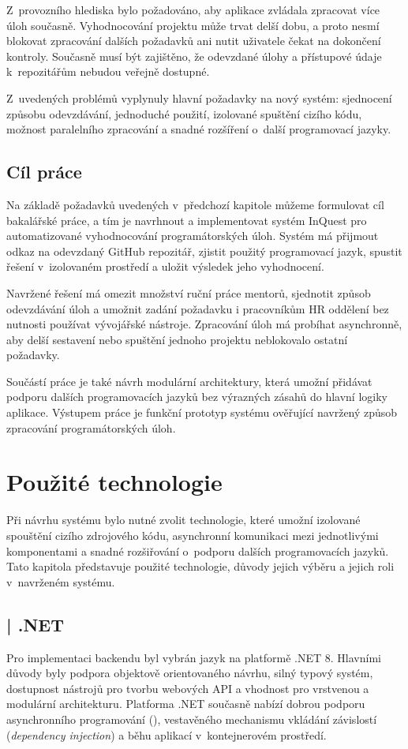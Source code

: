 \documentclass[
  biblatex,
  figures,
  tables,
  glossaries,
  index
]{kidiplom}
\begin{document}
Z~provozního hlediska bylo požadováno, aby aplikace zvládala zpracovat více úloh současně. Vyhodnocování projektu může trvat delší dobu, a proto nesmí blokovat zpracování dalších požadavků ani nutit uživatele čekat na dokončení kontroly. Současně musí být zajištěno, že odevzdané úlohy a přístupové údaje k~repozitářům nebudou veřejně dostupné.

Z~uvedených problémů vyplynuly hlavní požadavky na nový systém: sjednocení způsobu odevzdávání, jednoduché použití, izolované spuštění cizího kódu, možnost paralelního zpracování a snadné rozšíření o~další programovací jazyky.


\subsection{Cíl práce}
Na základě požadavků uvedených v~předchozí kapitole můžeme formulovat cíl bakalářské práce, a tím je navrhnout a implementovat systém InQuest pro automatizované vyhodnocování programátorských úloh. Systém má přijmout odkaz na odevzdaný GitHub repozitář, zjistit použitý programovací jazyk, spustit řešení v~izolovaném prostředí a uložit výsledek jeho vyhodnocení.

Navržené řešení má omezit množství ruční práce mentorů, sjednotit způsob odevzdávání úloh a umožnit zadání požadavku i pracovníkům HR oddělení bez nutnosti používat vývojářské nástroje. Zpracování úloh má probíhat asynchronně, aby delší sestavení nebo spuštění jednoho projektu neblokovalo ostatní požadavky.

Součástí práce je také návrh modulární architektury, která umožní přidávat podporu dalších programovacích jazyků bez výrazných zásahů do hlavní logiky aplikace. Výstupem práce je funkční prototyp systému ověřující navržený způsob zpracování programátorských úloh.

\newpage


\section{Použité technologie}
Při návrhu systému bylo nutné zvolit technologie, které umožní izolované spouštění cizího zdrojového kódu, asynchronní komunikaci mezi jednotlivými komponentami a snadné rozšiřování o~podporu dalších programovacích jazyků. Tato kapitola představuje použité technologie, důvody jejich výběru a jejich roli v~navrženém systému.


\subsection{\csharp{} | .NET}
Pro implementaci backendu byl vybrán jazyk \csharp{} na platformě .NET 8. Hlavními důvody byly podpora objektově orientovaného návrhu, silný typový systém, dostupnost nástrojů pro tvorbu webových API a vhodnost pro vrstvenou a modulární architekturu. Platforma .NET současně nabízí dobrou podporu asynchronního programování (), vestavěného mechanismu vkládání závislostí (\textit{dependency injection}) a běhu aplikací v~kontejnerovém prostředí.~\cite{dotnet}
\end{document}
